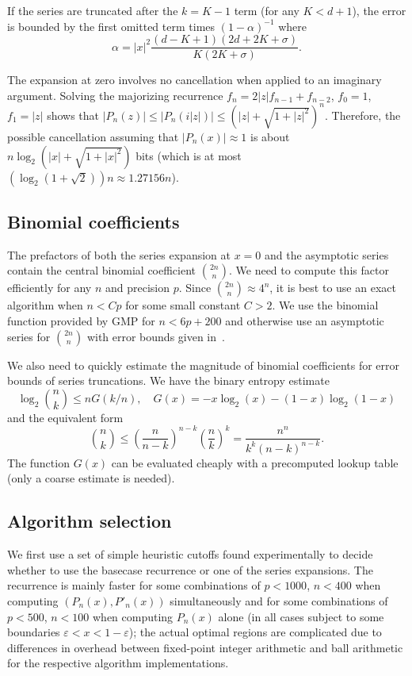 \documentclass[11pt,a4paper]{article}
\begin{document}
If the series are truncated after the $k = K - 1$ term
(for any $K < d + 1$), the error is bounded by the first
omitted term times $(1-\alpha)^{-1}$
where
$$\alpha = |x|^2 \frac{(d-K+1)(2d+2K+\sigma)}{K (2K+\sigma)}.$$

The expansion at zero involves no cancellation
when applied to an imaginary argument.
Solving the majorizing recurrence $f_n = 2 |z| f_{n-1} + f_{n-2}$,
$f_0 = 1$, $f_1 = |z|$ shows that
$|P_n(z)| \le |P_n(i|z|)| \le \left(|z| + \sqrt{1 + |z|^2}\right)^n$.
Therefore, the possible cancellation assuming that $|P_n(x)| \approx 1$
is about $n \log_2(|x| + \sqrt{1 + |x|^2})$ bits
(which is at most $(\log_2 (1+\sqrt{2})) n \approx 1.27156n$).

\subsection{Binomial coefficients}

The prefactors of both the series expansion at $x = 0$ and the asymptotic series
contain the central binomial coefficient ${2n \choose n}$.
We need to compute this factor efficiently for any $n$ and precision $p$.
Since ${2n \choose n} \approx 4^n$, it is best to use
an exact algorithm when $n < Cp$ for some small constant $C > 2$.
We use the binomial function provided by GMP for $n < 6p + 200$
and otherwise use an asymptotic series for ${2n \choose n}$
with error bounds given in~\cite{brent2016asymptotic}.

We also need to quickly estimate the magnitude of binomial coefficients
for error bounds of series truncations.
We have the binary entropy estimate
$$\log_2 {n \choose k} \le n G(k/n), \quad G(x) = -x \log_2(x) - (1-x) \log_2(1-x)$$
and the equivalent form
$${n \choose k} \le \left(\frac{n}{n-k}\right)^{n-k} \left(\frac{n}{k}\right)^k = \frac{n^n}{k^k (n-k)^{n-k}}.$$
The function $G(x)$ can be evaluated cheaply with a precomputed
lookup table (only a coarse estimate is needed).

\subsection{Algorithm selection}

\label{sec:selection}

We first use a set of simple heuristic cutoffs found experimentally to decide whether to use the basecase recurrence or one of the series expansions. The recurrence is mainly faster for some combinations of $p < 1000$, $n < 400$ when computing $(P_n(x), P'_n(x))$ simultaneously and for some combinations of $p < 500$, $n < 100$ when computing $P_n(x)$ alone (in all cases subject to some boundaries $\varepsilon < x < 1 - \varepsilon$); the actual optimal regions are complicated due to differences in overhead between fixed-point integer arithmetic and ball arithmetic for the respective algorithm implementations.
\end{document}
